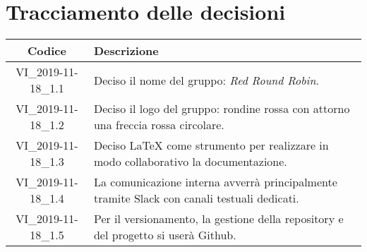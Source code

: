 \section*{Tracciamento delle decisioni}

\begin{center}
	\begin{longtable}{|c|p{12.25cm}|}
	\hline
	\rowcolor{lighter-grayer}
	\textbf{Codice} & \textbf{Descrizione} \\
	\hline
	\endfirsthead

	\hline
	VI\_2019-11-18\_1.1 & Deciso il nome del gruppo: \textit{Red Round Robin}. \\
	\hline
	VI\_2019-11-18\_1.2 & Deciso il logo del gruppo: rondine rossa con attorno una freccia rossa circolare. \\
	\hline
	VI\_2019-11-18\_1.3 & Deciso \LaTeX{} come strumento per realizzare in modo collaborativo la documentazione. \\
	\hline
	VI\_2019-11-18\_1.4 & La comunicazione interna avverrà principalmente tramite Slack con canali testuali dedicati. \\
	\hline
	VI\_2019-11-18\_1.5 & Per il versionamento, la gestione della repository e del progetto si userà Github. \\
	\hline

	\end{longtable}
\end{center}
